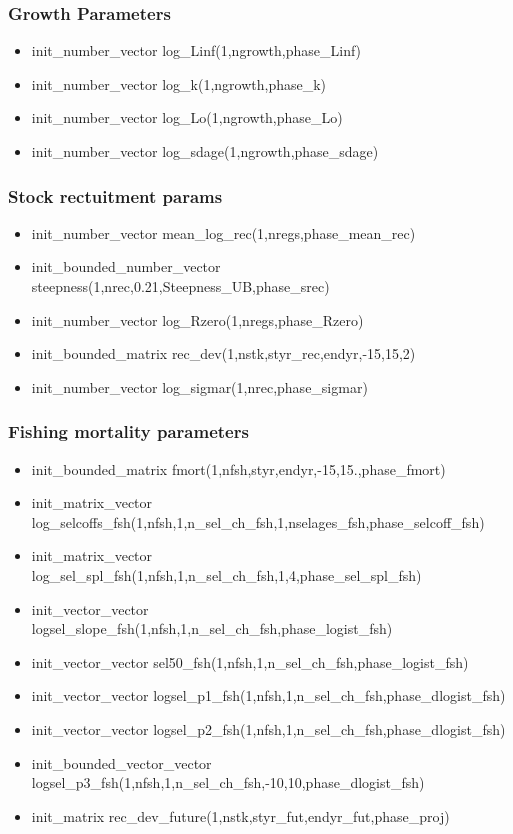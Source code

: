 \documentclass{article}
\begin{document}
\subsubsection{Growth Parameters}
\begin{itemize}
    \item init\_number\_vector log\_Linf(1,ngrowth,phase\_Linf)
    \item init\_number\_vector log\_k(1,ngrowth,phase\_k)
    \item init\_number\_vector log\_Lo(1,ngrowth,phase\_Lo)
    \item init\_number\_vector log\_sdage(1,ngrowth,phase\_sdage)
    
\end{itemize}
\subsubsection{Stock rectuitment params}
\begin{itemize}
    \item init\_number\_vector mean\_log\_rec(1,nregs,phase\_mean\_rec)
    \item init\_bounded\_number\_vector steepness(1,nrec,0.21,Steepness\_UB,phase\_srec)
    \item init\_number\_vector log\_Rzero(1,nregs,phase\_Rzero)
    \item init\_bounded\_matrix rec\_dev(1,nstk,styr\_rec,endyr,-15,15,2)
    \item init\_number\_vector log\_sigmar(1,nrec,phase\_sigmar)
    
\end{itemize}
\subsubsection{Fishing mortality parameters}
\begin{itemize}
    \item init\_bounded\_matrix fmort(1,nfsh,styr,endyr,-15,15.,phase\_fmort)
    \item init\_matrix\_vector log\_selcoffs\_fsh(1,nfsh,1,n\_sel\_ch\_fsh,1,nselages\_fsh,phase\_selcoff\_fsh)
    \item init\_matrix\_vector  log\_sel\_spl\_fsh(1,nfsh,1,n\_sel\_ch\_fsh,1,4,phase\_sel\_spl\_fsh)
    \item init\_vector\_vector logsel\_slope\_fsh(1,nfsh,1,n\_sel\_ch\_fsh,phase\_logist\_fsh)
    \item init\_vector\_vector     sel50\_fsh(1,nfsh,1,n\_sel\_ch\_fsh,phase\_logist\_fsh)
    \item init\_vector\_vector logsel\_p1\_fsh(1,nfsh,1,n\_sel\_ch\_fsh,phase\_dlogist\_fsh)
    \item init\_vector\_vector logsel\_p2\_fsh(1,nfsh,1,n\_sel\_ch\_fsh,phase\_dlogist\_fsh)
    \item init\_bounded\_vector\_vector logsel\_p3\_fsh(1,nfsh,1,n\_sel\_ch\_fsh,-10,10,phase\_dlogist\_fsh)
    \item init\_matrix rec\_dev\_future(1,nstk,styr\_fut,endyr\_fut,phase\_proj)
\end{itemize}
\end{document}

